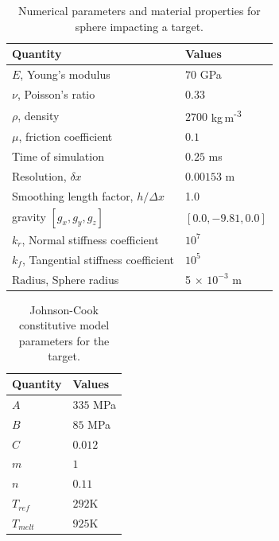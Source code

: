 \begin{table}[!ht]
  \caption{Numerical parameters and material properties for sphere impacting a target.}%
  \label{tab:mpe-2-mat-prop}
  \centering
  \begin{tabular}[!ht]{ll}
    \toprule
    Quantity & Values\\
    \midrule
    $E$, Young's modulus & $70$ GPa \\
    $\nu$, Poisson's ratio & $0.33$ \\
    $\rho$, density & $2700$ kg\,m\textsuperscript{-3} \\
    $\mu$, friction coefficient & $0.1$ \\
    Time of simulation & $0.25$ ms \\
    Resolution, $\delta x$ & $0.00153$ m\\
    Smoothing length factor, $h/\Delta x$ & 1.0\\
    gravity $[g_x, g_y, g_z]$ & $[0.0, -9.81, 0.0]$\\
    $k_r$, Normal stiffness coefficient & $10^{7}$ \\
    $k_f$, Tangential stiffness coefficient & $10^{5}$ \\
    $\text{Radius}$, Sphere radius & 5 $\times$ $10^{-3}$ m\\
    \bottomrule
  \end{tabular}
\end{table}
\begin{table}[!ht]
  \caption{Johnson-Cook constitutive model parameters for the target.}%
  \label{tab:mpe-2-john-prop}
  \centering
  \begin{tabular}[!ht]{ll}
    \toprule
    Quantity & Values\\
    \midrule
    $A$ & $335$ MPa \\
    $B$ & $85$ MPa \\
    $C$ & $0.012$ \\
    $m$ & $1$ \\
    $n$ & $0.11$ \\
    $T_{ref}$ & $292$K \\
    $T_{melt}$ & $925$K \\
    \bottomrule
  \end{tabular}
\end{table}




